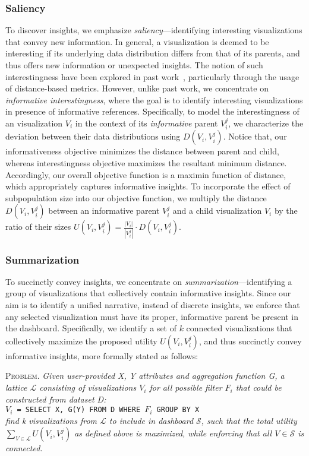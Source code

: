 \subsubsection{Saliency}
To discover insights, we emphasize \emph{saliency}---identifying interesting visualizations that convey new information. In general, a visualization is deemed to be interesting if its underlying data distribution differs from that of its parents, and thus offers new information or unexpected insights. The notion of such interestingness have been explored in past work~\cite{Vartak2015,Correll2016,Itti2009}, particularly through the usage of distance-based metrics. However, unlike past work, we concentrate on \emph{informative interestingness}, where the goal is to identify interesting visualizations in presence of informative references. Specifically, to model the interestingness of an visualization $V_i$ in the context of its \emph{informative} parent $V_i^j$, we characterize the deviation between their data distributions using $D(V_i, V_i^j)$. Notice that, our informativeness objective minimizes the distance between parent and child, whereas interestingness objective maximizes the resultant minimum distance. Accordingly, our overall objective function is a maximin function of distance, which appropriately captures informative insights. To incorporate the effect of subpopulation size into our objective function, we multiply the distance $D(V_i, V_i^j)$ between an informative parent $V_i^j$ and a child visualization $V_i$ by the ratio of their sizes  $U(V_i, V_i^j) = \frac{|V_i|}{|V_i^{j}|} \cdot D(V_i, V_i^j)$.
\subsubsection{Summarization}
To succinctly convey insights, we concentrate on \emph{summarization}---identifying a group of visualizations that collectively contain informative insights. Since our aim is to identify a unified narrative, instead of discrete insights, we enforce that any selected visualization must have its proper, informative parent be present in the dashboard. Specifically, we identify a set of $k$ connected visualizations that collectively maximize the proposed utility $U(V_i, V_i^j)$, and thus succinctly convey informative insights, more formally stated as follows:

\par \textsc{Problem.} \textit{Given user-provided X, Y attributes and aggregation function G, a lattice $\mathcal{L}$ consisting of visualizations $V_i$ for all possible filter $F_i$ that could be constructed from dataset D:} 
\\ \texttt{$V_i$ = SELECT X, G(Y) FROM D WHERE $F_i$ GROUP BY X}
\\ \textit{find k visualizations from $\mathcal{L}$ to include in dashboard $\mathcal{S}$, such that the total utility $\sum_{V\in \mathcal{L}} U(V_i, V_i^j)$ as defined above is maximized, while enforcing that all $V\in \mathcal{S}$ is connected.}

